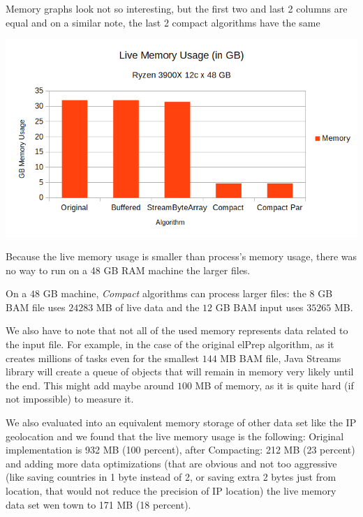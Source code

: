 \documentclass[a4paper,twoside]{article}
\begin{document}
Memory graphs look not so interesting, but the first two and last 2 columns are equal and on a similar note, the last 2 compact algorithms have the same 

\begin{center}
	\includegraphics[scale=0.5]{images/memory_usage_1_2G.png}
\end{center}

Because the live memory usage is smaller than process's memory usage, there was no way to run on a 48 GB RAM machine the larger files.

On a $48$ GB machine, {\textit{Compact}} algorithms can process larger files: the $8$ GB BAM file uses $24283$ MB of live data and the $12$ GB BAM input uses $35 265$ MB.

We also have to note that not all of the used memory represents data related to the input file.
For example, in the case of the original elPrep algorithm, as it creates millions of tasks even for the smallest $144$ MB BAM file, Java Streams library will create a queue of objects that will remain in memory very likely until the end. This might add maybe around $100$ MB of memory, as it is quite hard (if not impossible) to measure it.

We also evaluated into an equivalent memory storage of other data set like the IP geolocation and we found that the live memory usage is the following: Original implementation is 932 MB (100 percent), after Compacting: 212 MB (23 percent) and adding more data optimizations (that are obvious and not too aggressive (like saving countries in 1 byte instead of 2, or saving extra 2 bytes just from location, that would not reduce the precision of IP location) the live memory data set wen town to 171 MB (18 percent). 
\end{document}
